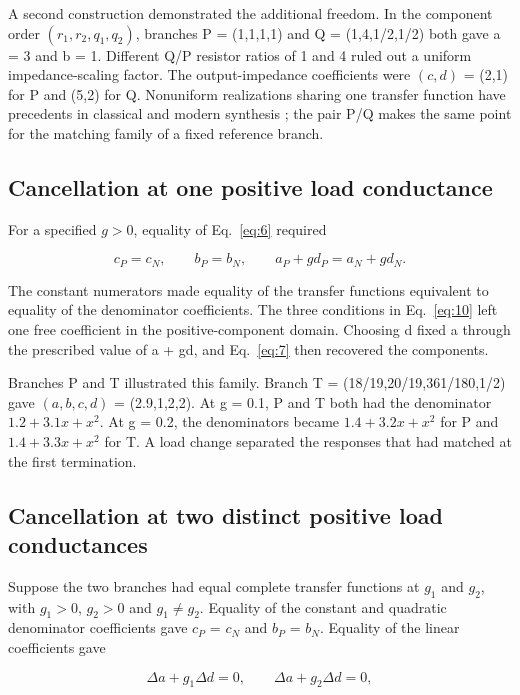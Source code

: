 A second construction demonstrated the additional freedom. In the component order \((r_1,r_2,q_1,q_2)\), branches P = (1,1,1,1) and Q = (1,4,1/2,1/2) both gave a = 3 and b = 1. Different Q/P resistor ratios of 1 and 4 ruled out a uniform impedance-scaling factor. The output-impedance coefficients were \((c,d)\) = (2,1) for P and (5,2) for Q. Nonuniform realizations sharing one transfer function have precedents in classical and modern synthesis \citep{fialkow1951rcladder,wang2017rcladder}; the pair P/Q makes the same point for the matching family of a fixed reference branch.

\subsection{Cancellation at one positive load conductance}

For a specified \(g>0\), equality of Eq.~\eqref{eq:6} required

\begin{equation}\label{eq:10}
c_P=c_N,\qquad b_P=b_N,\qquad
 a_P+gd_P=a_N+gd_N.
\end{equation}

The constant numerators made equality of the transfer functions equivalent to equality of the denominator coefficients. The three conditions in Eq.~\eqref{eq:10} left one free coefficient in the positive-component domain. Choosing d fixed a through the prescribed value of a + gd, and Eq.~\eqref{eq:7} then recovered the components.

Branches P and T illustrated this family. Branch T = (18/19,20/19,361/180,1/2) gave \((a,b,c,d)\) = (2.9,1,2,2). At g = 0.1, P and T both had the denominator \(1.2+3.1x+x^2\). At g = 0.2, the denominators became \(1.4+3.2x+x^2\) for P and \(1.4+3.3x+x^2\) for T. A load change separated the responses that had matched at the first termination.

\subsection{Cancellation at two distinct positive load conductances}

Suppose the two branches had equal complete transfer functions at \(g_1\) and \(g_2\), with \(g_1>0\), \(g_2>0\) and \(g_1\ne g_2\). Equality of the constant and quadratic denominator coefficients gave \(c_P\) = \(c_N\) and \(b_P\) = \(b_N\). Equality of the linear coefficients gave

\begin{equation}\label{eq:11}
\Delta a+g_1\Delta d=0,\qquad
\Delta a+g_2\Delta d=0,
\end{equation}

